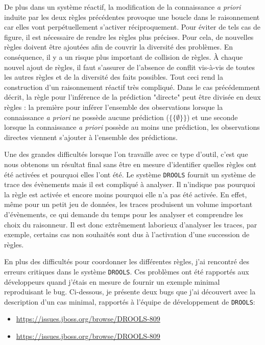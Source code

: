 \begin{refsegment}
De plus dans un système réactif, la modification de la connaissance \textit{a priori} induite par les deux règles précédentes provoque une boucle dans le raisonnement car elles vont perpétuellement s'activer réciproquement. Pour éviter de tels cas de figure, il est nécessaire de rendre les règles plus précises. Pour cela, de nouvelles règles doivent être ajoutées afin de couvrir la diversité des problèmes. En conséquence, il y a un risque plus important de collision de règles. À chaque nouvel ajout de règles, il faut s'assurer de l'absence de conflit vis-à-vis de toutes les autres règles et de la diversité des faits possibles. Tout ceci rend la construction d'un raisonnement réactif très compliqué. Dans le cas précédemment décrit, la règle  pour l'inférence de la  prédiction "directe"  peut être divisée en deux règles : la première pour inférer l'ensemble des observations lorsque la connaissance \textit{a priori} ne possède aucune prédiction ($\{\{\emptyset\}\}$) et une seconde lorsque la connaissance \textit{a priori} possède au moins une prédiction, les observations directes viennent s'ajouter à l'ensemble des prédictions.

Une des grandes difficultés lorsque l'on travaille avec ce type d'outil, c'est que nous obtenons un résultat final sans être en mesure d'identifier quelles règles ont été activées et pourquoi elles l'ont été. Le système \texttt{DROOLS} fournit un système de trace des évènements mais il est compliqué à analyser. Il n'indique pas pourquoi la règle est activée et encore moins pourquoi elle n'a pas été activée. En effet, même pour un petit jeu de données, les traces produisent un volume important d'évènements, ce qui demande du temps pour les analyser et comprendre les choix du raisonneur. Il est donc extrêmement laborieux d'analyser les traces, par exemple, certains cas non souhaités sont dus à l'activation d'une succession de règles.

En plus des difficultés pour coordonner les différentes règles, j'ai rencontré des erreurs critiques dans le système \texttt{DROOLS}. Ces problèmes ont été rapportés aux développeurs quand j'étais en mesure de fournir un exemple minimal reproduisant le bug. Ci-dessous, je présente deux bugs que j'ai découvert avec la description d'un cas minimal, rapportés à l'équipe de développement de \texttt{DROOLS}:
\begin{itemize}
	\item \url{https://issues.jboss.org/browse/DROOLS-809}
	\item \url{https://issues.jboss.org/browse/DROOLS-809}
\end{itemize}
 

\end{refsegment}
